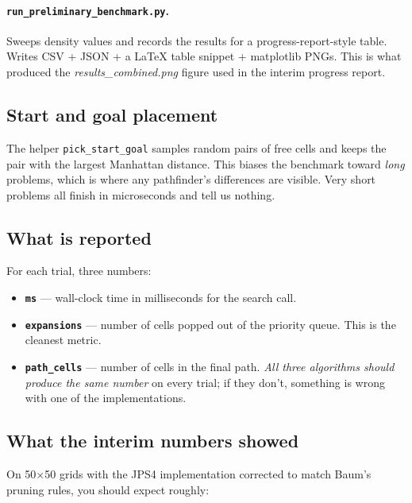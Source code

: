 \documentclass[11pt,a4paper]{article}
\begin{document}
\paragraph{\texttt{run\_preliminary\_benchmark.py}.}
Sweeps density values and records the results for a progress-report-style table. Writes CSV + JSON + a LaTeX table snippet + matplotlib PNGs. This is what produced the \textit{results\_combined.png} figure used in the interim progress report.

\subsection{Start and goal placement}

The helper \texttt{pick\_start\_goal} samples random pairs of free cells and keeps the pair with the largest Manhattan distance. This biases the benchmark toward \emph{long} problems, which is where any pathfinder's differences are visible. Very short problems all finish in microseconds and tell us nothing.

\subsection{What is reported}

For each trial, three numbers:

\begin{itemize}[leftmargin=20pt,itemsep=2pt]
  \item \textbf{\texttt{ms}} --- wall-clock time in milliseconds for the search call.
  \item \textbf{\texttt{expansions}} --- number of cells popped out of the priority queue. This is the cleanest metric.
  \item \textbf{\texttt{path\_cells}} --- number of cells in the final path. \emph{All three algorithms should produce the same number} on every trial; if they don't, something is wrong with one of the implementations.
\end{itemize}

\subsection{What the interim numbers showed}

On 50$\times$50 grids with the JPS4 implementation corrected to match Baum's pruning rules, you should expect roughly:
\end{document}

